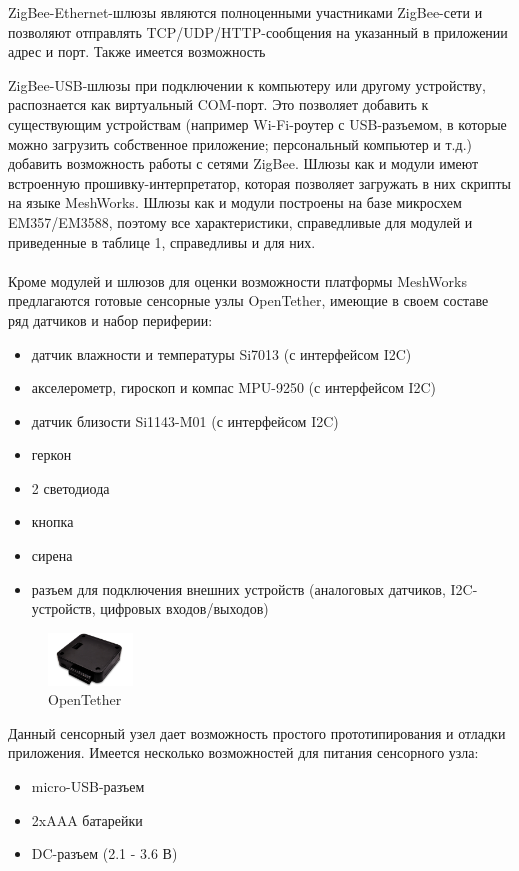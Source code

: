 \documentclass[12pt]{article}
\begin{document}
ZigBee-Ethernet-шлюзы являются полноценными участниками ZigBee-сети и позволяют 
отправлять TCP/UDP/HTTP-сообщения на указанный в приложении адрес и порт. Также
имеется возможность

ZigBee-USB-шлюзы при подключении к компьютеру или другому устройству, распознается
как виртуальный COM-порт. Это позволяет добавить к существующим устройствам 
(например Wi-Fi-роутер с USB-разъемом, в которые можно загрузить собственное приложение;
персональный компьютер и т.д.) добавить возможность работы с сетями ZigBee. Шлюзы
как и модули имеют встроенную прошивку-интерпретатор, которая позволяет загружать
в них скрипты на языке MeshWorks. Шлюзы как и модули построены на базе микросхем
EM357/EM3588, поэтому все характеристики, справедливые для модулей и приведенные
в таблице 1, справедливы и для них.
\\\\
Кроме модулей и шлюзов для оценки возможности платформы MeshWorks предлагаются 
готовые сенсорные узлы OpenTether, имеющие в своем составе ряд датчиков и набор периферии:
\begin{itemize}
    \item датчик влажности и температуры Si7013 (с интерфейсом I2C)
    \item акселерометр, гироскоп и компас MPU-9250 (с интерфейсом I2C)
    \item датчик близости Si1143-M01 (с интерфейсом I2C)
    \item геркон
    \item 2 светодиода
    \item кнопка
    \item сирена
    \item разъем для подключения внешних устройств (аналоговых датчиков, I2C-устройств,
    цифровых входов/выходов)
\end{itemize}

\begin{figure}
  \begin{center}
    \includegraphics[width=0.20\textwidth]{sensor_node.png}
  \end{center}
  \caption{OpenTether}
\end{figure}

Данный сенсорный узел дает возможность простого прототипирования и отладки приложения.
Имеется несколько возможностей для питания сенсорного узла:
\begin{itemize}
 \item micro-USB-разъем
 \item 2xAAA батарейки
 \item DC-разъем (2.1 - 3.6 В)
\end{itemize}
\end{document}
